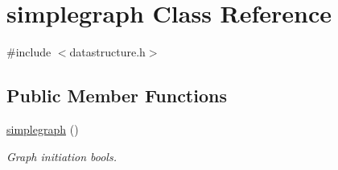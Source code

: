 \hypertarget{classsimplegraph}{\section{simplegraph \-Class \-Reference}
\label{classsimplegraph}
}


{\ttfamily \#include $<$datastructure.\-h$>$}

\subsection*{\-Public \-Member \-Functions}
\begin{DoxyCompactItemize}
\item 
\hypertarget{classsimplegraph_a22e47926bf0d18a7b15d2ea298ead3a4}{\hyperlink{classsimplegraph_a22e47926bf0d18a7b15d2ea298ead3a4}{simplegraph} ()}\label{classsimplegraph_a22e47926bf0d18a7b15d2ea298ead3a4}

\begin{DoxyCompactList}\small\item\em \-Graph initiation bools. \end{DoxyCompactList}\end{DoxyCompactItemize}
